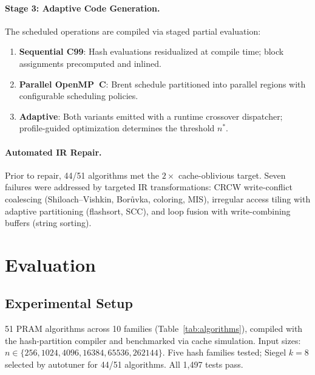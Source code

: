 \documentclass[11pt]{article}
\begin{document}
\paragraph{Stage 3: Adaptive Code Generation.}
The scheduled operations are compiled via staged partial evaluation:
\begin{enumerate}
\item \textbf{Sequential C99}: Hash evaluations residualized at compile
  time; block assignments precomputed and inlined.
\item \textbf{Parallel OpenMP~C}: Brent schedule partitioned into
  parallel regions with configurable scheduling policies.
\item \textbf{Adaptive}: Both variants emitted with a runtime crossover
  dispatcher; profile-guided optimization determines the threshold $n^*$.
\end{enumerate}

\paragraph{Automated IR Repair.}
Prior to repair, 44/51 algorithms met the $2\times$ cache-oblivious
target.  Seven failures were addressed by targeted IR transformations:
CRCW write-conflict coalescing (Shiloach--Vishkin, Bor\r{u}vka,
coloring, MIS), irregular access tiling with adaptive partitioning
(flashsort, SCC), and loop fusion with write-combining buffers
(string sorting).

\section{Evaluation}
\label{sec:evaluation}

\subsection{Experimental Setup}

51 PRAM algorithms across 10 families (Table~\ref{tab:algorithms}),
compiled with the hash-partition compiler and benchmarked via cache
simulation.  Input sizes:
$n \in \{256, 1024, 4096, 16384, 65536, 262144\}$.
Five hash families tested; Siegel $k = 8$ selected by autotuner for
44/51 algorithms.  All 1,497 tests pass.
\end{document}
